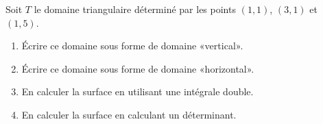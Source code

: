 
\begin{exercice}\label{exoOutilsMath-0093}

    Soit $T$ le domaine triangulaire déterminé par les points $(1,1)$, $(3,1)$ et $(1,5)$.
    \begin{enumerate}
        \item
            Écrire ce domaine sous forme de domaine «vertical».
        \item
            Écrire ce domaine sous forme de domaine «horizontal».
        \item
            En calculer la surface en utilisant une intégrale double.
        \item 
            En calculer la surface en calculant un déterminant.

    \end{enumerate}

\end{exercice}
